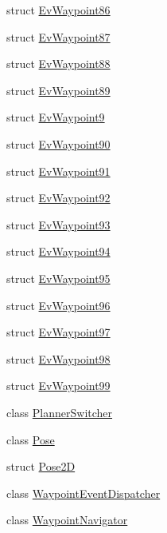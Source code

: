 \begin{DoxyCompactItemize}
struct \hyperlink{structcl__move__base__z_1_1EvWaypoint86}{Ev\+Waypoint86}
\item 
struct \hyperlink{structcl__move__base__z_1_1EvWaypoint87}{Ev\+Waypoint87}
\item 
struct \hyperlink{structcl__move__base__z_1_1EvWaypoint88}{Ev\+Waypoint88}
\item 
struct \hyperlink{structcl__move__base__z_1_1EvWaypoint89}{Ev\+Waypoint89}
\item 
struct \hyperlink{structcl__move__base__z_1_1EvWaypoint9}{Ev\+Waypoint9}
\item 
struct \hyperlink{structcl__move__base__z_1_1EvWaypoint90}{Ev\+Waypoint90}
\item 
struct \hyperlink{structcl__move__base__z_1_1EvWaypoint91}{Ev\+Waypoint91}
\item 
struct \hyperlink{structcl__move__base__z_1_1EvWaypoint92}{Ev\+Waypoint92}
\item 
struct \hyperlink{structcl__move__base__z_1_1EvWaypoint93}{Ev\+Waypoint93}
\item 
struct \hyperlink{structcl__move__base__z_1_1EvWaypoint94}{Ev\+Waypoint94}
\item 
struct \hyperlink{structcl__move__base__z_1_1EvWaypoint95}{Ev\+Waypoint95}
\item 
struct \hyperlink{structcl__move__base__z_1_1EvWaypoint96}{Ev\+Waypoint96}
\item 
struct \hyperlink{structcl__move__base__z_1_1EvWaypoint97}{Ev\+Waypoint97}
\item 
struct \hyperlink{structcl__move__base__z_1_1EvWaypoint98}{Ev\+Waypoint98}
\item 
struct \hyperlink{structcl__move__base__z_1_1EvWaypoint99}{Ev\+Waypoint99}
\item 
class \hyperlink{classcl__move__base__z_1_1PlannerSwitcher}{Planner\+Switcher}
\item 
class \hyperlink{classcl__move__base__z_1_1Pose}{Pose}
\item 
struct \hyperlink{structcl__move__base__z_1_1Pose2D}{Pose2D}
\item 
class \hyperlink{classcl__move__base__z_1_1WaypointEventDispatcher}{Waypoint\+Event\+Dispatcher}
\item 
class \hyperlink{classcl__move__base__z_1_1WaypointNavigator}{Waypoint\+Navigator}
\end{DoxyCompactItemize}
